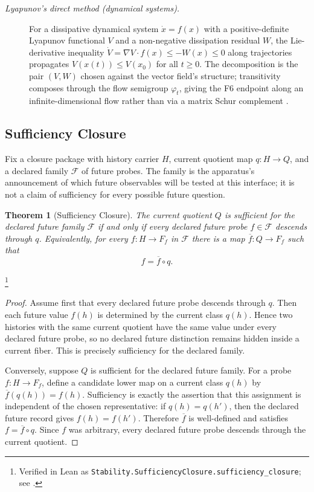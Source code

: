 \documentclass[11pt]{article}
\newcommand{\currQ}{Q}                 \newcommand{\predM}{M}                 \newcommand{\splitObs}{\Delta}         \newcommand{\quotMap}{\pi}             \newcommand{\accessQ}{q_I}             \newcommand{\obsSig}{\sigma_I}         \newcommand{\closureForm}{\mathsf{cl}} \newcommand{\BirdInt}{\mathsf{BirdInt}}
\newtheorem{theorem}{Theorem}[section]
\theoremstyle{definition}
\begin{document}
\begin{description}
\item[\emph{Lyapunov's direct method (dynamical systems).}]
For a dissipative dynamical system \(\dot x=f(x)\) with a
positive-definite Lyapunov functional \(V\) and a non-negative
dissipation
residual \(W\), the Lie-derivative inequality
\(\dot V=\nabla V\!\cdot\!f(x)\le-W(x)\le 0\) along trajectories
propagates \(V(x(t))\le V(x_0)\) for all \(t\ge 0\).  The
decomposition is the pair \((V,W)\) chosen against the vector field's
structure; transitivity composes through the flow semigroup
\(\varphi_t\), giving the F6 endpoint along an infinite-dimensional
flow rather than via a matrix Schur complement
\citep{Lyapunov1892StabilityMotion}.
\end{description}

\subsection{Sufficiency Closure}\label{sec:stability:sufficiency-closure}

Fix a closure package with history carrier \(H\), current quotient
map \(q:H\to\currQ\), and a declared family \(\mathcal F\) of future
probes.  The family is the apparatus's announcement of which future
observables will be tested at this interface; it is not a claim of
sufficiency for every possible future question.

\begin{theorem}[Sufficiency Closure]\label{thm:F7}
The current quotient \(\currQ\) is sufficient for the declared future
family \(\mathcal F\) if and only if every declared future probe
\(f\in\mathcal F\) descends through \(q\).  Equivalently, for every
\(f:H\to F_f\) in \(\mathcal F\) there is a map
\(\overline f:\currQ\to F_f\) such that
\[
  f=\overline f\circ q .
\]
\end{theorem}
\footnote{Verified in Lean as
\texttt{Stability.SufficiencyClosure.\allowbreak{}sufficiency\_closure};
see .}
\begin{proof}
Assume first that every declared future probe descends through
\(q\).  Then each future value \(f(h)\) is determined by the current
class \(q(h)\).  Hence two histories with the same current quotient
have the same value under every declared future probe, so no
declared future distinction remains hidden inside a current fiber.
This is precisely sufficiency for the declared family.

Conversely, suppose \(\currQ\) is sufficient for the declared future
family.  For a probe \(f:H\to F_f\), define a candidate lower map on
a current class \(q(h)\) by \(\overline f(q(h))=f(h)\).  Sufficiency
is exactly the assertion that this assignment is independent of the
chosen representative: if \(q(h)=q(h')\), then the declared future
record gives \(f(h)=f(h')\).  Therefore \(\overline f\) is
well-defined and satisfies \(f=\overline f\circ q\).  Since \(f\)
was arbitrary, every declared future probe descends through the
current quotient.
\end{proof}
\end{document}
